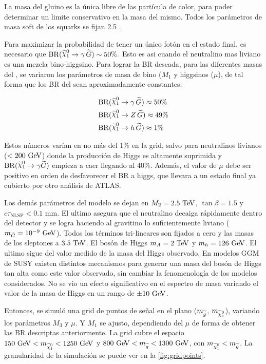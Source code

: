 La masa del gluino es la única libre de las partícula de color, para poder determinar un
limite conservativo en la masa del mismo. Todos los parámetros de masa soft de los
squarks se fijan 2.5 \tev.

Para maximizar la probabilidad de tener un único fotón en el estado final,
es necesario que $\mathrm{BR}(\ninoone \to \gam\,\gravino) \sim 50\%$.
Esto es asi cuando el neutralino mas liviano es una mezcla bino-higgsino.
Para lograr la BR deseada, para las diferentes masas del {\ninoone}, se variaron los
parámetros de masa de bino ($M_1$ y higgsinos ($\mu$),
de tal forma que los BR del {\ninoone} sean aproximadamente constantes:

\begin{align}
  &\mathrm{BR}(\ninoone \to \gam\, \gravino) \approx 50\% \\
  &\mathrm{BR}(\ninoone \to Z\, \gravino) \approx 49\% \\
  &\mathrm{BR}(\ninoone \to h\, \gravino) \approx 1\%
\end{align}

Estos números varían en no más del 1\% en la grid, salvo para neutralinos livianos
($<200\gev$) donde la producción de Higgs es altamente suprimida y
$\mathrm{BR}(\ninoone \to \gam \gravino)$ empieza a caer llegando al 40\%.
Además, el valor de $\mu$ debe ser positivo en orden de desfavorecer el BR a higgs,
que llevara a un estado final ya cubierto por otro análisis de ATLAS.

Los demás parámetros del modelo se dejan en $M_2=2.5\tev$,
$\tan\beta=1.5$ y $c\tau_{\mathrm{NLSP}} < 0.1$ mm. El ultimo asegura
que el neutralino decaiga rápidamente dentro del detector y se logra haciendo al
gravitino lo suficientemente liviano ($m_{\tilde{G}}=10^{-9} \gev$). Todos los
términos tri-lineares son fijados a cero y las masas de los sleptones a $3.5 \tev$.
El bosón de Higgs $m_{A} = 2 \tev$ y $m_{h} = 126 \gev$. El ultimo
sigue del valor medido de la masa del Higgs observado. En modelos GGM de SUSY
existen distintos
mecanismos\cite{Craig:2011yk,Auzzi:2011eu,Csaki:2012fh,Larsen:2012rq,Craig:2012hc}
para generar una masa del bosón de Higgs tan alta como este valor observado, sin
cambiar la fenomenología de los modelos considerados. No se vio un efecto
significativo en el espectro de masa variando el valor de la masa de Higgs en
un rango de $\pm 10 \gev$.

Entonces, se simuló una grid de puntos de señal en el plano ($m_{\widetilde{g}}$, $m_{\ninoone}$),
variando los parámetros $M_3$ y $\mu$. Y $M_1$ se ajusto, dependiendo del $\mu$ de forma
de obtener las BR descriptas anteriormente. La grid cubre el espacio
$150\gev < m_{\ninoone} < 1250 \gev$ y $800\gev < m_{\gluino} < 1300 \gev$, con $m_{\ninoone} <
m_{\gluino}$. La granularidad de la simulación se puede ver en la \cref{fig:gridpoints}.



